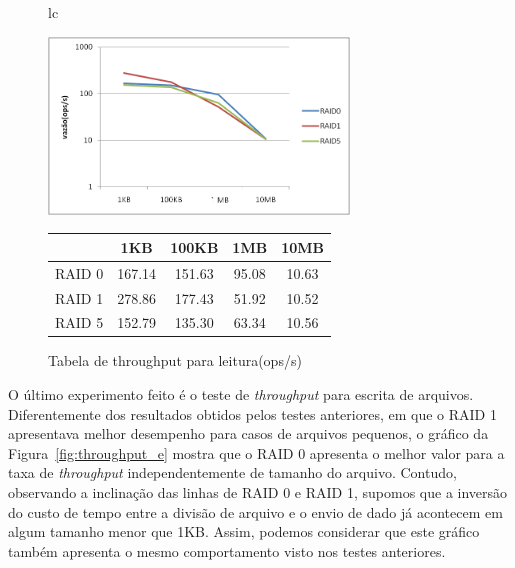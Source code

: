 	\begin{figure}[h]
		\begin{tabular}{lc}
			\begin{minipage}{.50\textwidth}
				\begin{center}
					
					\includegraphics[clip,width=8.0cm]{images/resultados/throughput_leitura.png}
					\caption{Gráfico de throughput para leitura(ops/s)}
					\label{fig:throughput_l}
					
				\end{center}
				
			\end{minipage}
			
			\begin{minipage}{.5\textwidth}
				\makeatletter
				\def\@captype{table}
				\makeatother
				\caption{Tabela de throughput para leitura(ops/s)}
				\label{tab:throughput_l}
				\begin{center}
					\begin{tabular}{|c|c|c|c|c|} \hline
						& 1KB & 100KB & 1MB & 10MB \\ \hline
						
						RAID 0	& 167.14 & 151.63 & 95.08 & 10.63\\ \hline
						RAID 1	& 278.86 & 177.43 & 51.92 & 10.52\\ \hline
						RAID 5	& 152.79 & 135.30 & 63.34 & 10.56\\ \hline
						
					\end{tabular}
				\end{center}
				
			\end{minipage}
		\end{tabular}
	\end{figure}
	
	
	O último experimento feito é o teste de \textit{throughput} para escrita de arquivos.
	Diferentemente dos resultados obtidos pelos testes anteriores, em que o RAID 1 apresentava melhor desempenho para casos de arquivos pequenos, o gráfico da Figura~\ref{fig:throughput_e} mostra que o RAID 0 apresenta o melhor valor para a taxa de \textit{throughput} independentemente de tamanho do arquivo. 
	Contudo, observando a inclinação das linhas de RAID 0 e RAID 1, supomos que a inversão do custo de tempo entre a divisão de arquivo e o envio de dado já acontecem em algum tamanho menor que 1KB. Assim, podemos considerar que este gráfico também apresenta o mesmo comportamento visto nos testes anteriores. 
	\\
	
